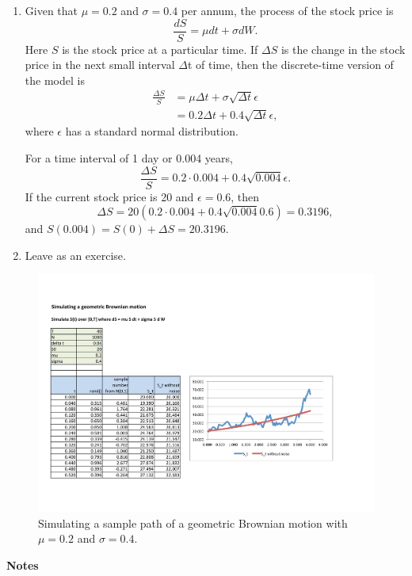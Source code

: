 \documentclass[landscape, 20pt]{extreport}
\theoremstyle{definition}
\theoremstyle{definition}
\theoremstyle{definition}
\theoremstyle{definition}
\theoremstyle{remark}
\begin{document}
\begin{enumerate}
\def\labelenumi{\arabic{enumi}.}
\item
  Given that \(\mu = 0.2\) and \(\sigma = 0.4\) per annum, the process of
  the stock price is \[\frac{dS}{S} = \mu dt + \sigma dW.\] Here \(S\)
  is the stock price at a particular time. If \(\Delta S\) is the change
  in the stock price in the next small interval \(\Delta\)t of time,
  then the discrete-time version of the model is \[\begin{aligned}
      \frac{\Delta S}{S} &= \mu \Delta t + \sigma \sqrt{\Delta t} \epsilon \\
                     &= 0.2 \Delta t + 0.4 \sqrt{\Delta t} \epsilon,
      \end{aligned}\] where \(\epsilon\) has a standard normal
  distribution.

  For a time interval of 1 day or 0.004 years,
  \[\frac{\Delta S}{S} = 0.2 \cdot 0.004 + 0.4 \sqrt{0.004} \epsilon.\]
  If the current stock price is 20 and \(\epsilon = 0.6\), then
  \[\Delta S = 20(0.2 \cdot 0.004 + 0.4 \sqrt{0.004} 0.6) = 0.3196,\]
  and \(S(0.004) = S(0) + \Delta S = 20.3196.\)
\item
  Leave as an exercise.
\end{enumerate}

\begin{figure}
\hypertarget{fig:GBM}{%
\centering
\includegraphics[width=8in,height=\textheight]{GBM.pdf}
\caption{Simulating a sample path of a geometric Brownian motion with
\(\mu =0.2\) and \(\sigma = 0.4\).}\label{fig:GBM}
}
\end{figure}

\textbf{Notes}
\end{document}
